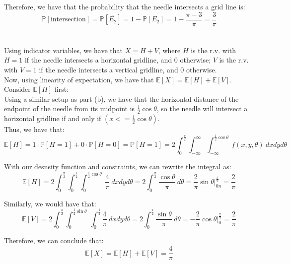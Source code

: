 \documentclass{article}
\begin{document}
Therefore, we have that the probability that the needle intersects a grid line is:
$$\mathbb{P}[\text{intersection}] =
\mathbb{P}[\overline{E_2}] =
1 - \mathbb{P}[E_2] = 1 - \frac{\pi-3}{\pi} = \frac{3}{\pi}$$ \\



 \\

Using indicator variables, we have that $X = H + V$, where $H$ is the r.v. with $H = 1$ if the needle intersects a horizontal gridline, and 0 otherwise; $V$ is the r.v. with $V = 1$ if the needle intersects a vertical gridline, and 0 otherwise. \\

Now, using linearity of expectation, we have that $\mathbb{E}[X] = \mathbb{E}[H] + \mathbb{E}[V]$. Consider $\mathbb{E}[H]$ first: \\

Using a similar setup as part (b), we have that the horizontal distance of the endpoint of the needle from its midpoint is $\frac{1}{2}\cos\theta$, so the needle will intersect a horizontal gridline if and only if $(x <= \frac{1}{2}\cos\theta)$. \\

Thus, we have that:
$$\mathbb{E}[H] = 1\cdot\mathbb{P}[H=1] + 0\cdot\mathbb{P}[H=0] =
\mathbb{P}[H=1] =
2\int_{0}^\frac{\pi}{2}
	\int_{-\infty}^\infty
		\int_{-\infty} ^ {\frac{1}{2}\cos\theta}\
			f(x,y,\theta)\ dxdyd\theta
$$

With our desnsity function and constraints, we can rewrite the integral as:
$$\mathbb{E}[H] =
2\int_{0}^\frac{\pi}{2}
	\int_{0}^\frac{1}{2}
		\int_{0}^{\frac{1}{2}\cos\theta}\
			\frac{4}{\pi}\ dxdyd\theta =
2\int_{0}^\frac{\pi}{2}
	\frac{\cos\theta}{\pi}\ d\theta =
\frac{2}{\pi}\sin\theta\Big|_{0n}^\frac{\pi}{2} =
\frac{2}{\pi} $$

Similarly, we would have that:
$$\mathbb{E}[V] =
2\int_{0}^\frac{\pi}{2}	
	\int_{0}^{\frac{1}{2}\sin\theta}\
		\int_{0}^\frac{1}{2}
			\frac{4}{\pi}\ dxdyd\theta =
2\int_{0}^\frac{\pi}{2}
	\frac{\sin\theta}{\pi}\ d\theta =
-\frac{2}{\pi}\cos\theta\Big|_{0}^\frac{\pi}{2} =
\frac{2}{\pi} $$

Therefore, we can conclude that:
$$\mathbb{E}[X] = \mathbb{E}[H] + \mathbb{E}[V] = \frac{4}{\pi}$$ \\



 \\
\end{document}
